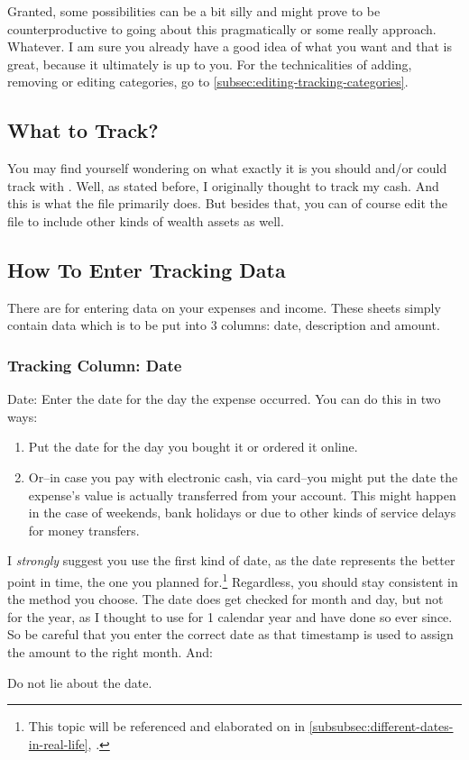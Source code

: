 Granted, some possibilities can be a bit silly and might prove to be counterproductive to going about this pragmatically or some really approach.
Whatever.
I am sure you already have a good idea of what you want and that is great, because it ultimately is up to you.
For the technicalities of adding, removing or editing categories, go to \autoref{subsec:editing-tracking-categories}.

\subsection{What to Track?}
\label{subsec:what-to-track}

You may find yourself wondering on what exactly it is you should and/or could track with \tfn.
Well, as stated before, I originally thought to track my cash.
And this is what the file primarily does.
But besides that, you can of course edit the file to include other kinds of wealth assets as well.

\subsection{How To Enter Tracking Data}
\label{subsec:enter-tracking-data}

There are  for entering data on your expenses and income.
These sheets simply contain data which is to be put into 3 columns: date, description and amount.

\subsubsection{Tracking Column: Date}
\label{subsec:tracking-column-date}

Date: Enter the date for the day the expense occurred.
You can do this in two ways:
\begin{enumerate}
	\item Put the date for the day you bought it or ordered it online.
	\item Or--in case you pay with electronic cash, \eg via card--you might put the date the expense's value is actually transferred from your account.
	This might happen in the case of weekends, bank holidays or due to other kinds of service delays for money transfers.
\end{enumerate}
I \emph{strongly} suggest you use the first kind of date, as the date represents the better point in time, \ie the one you planned for.\footnote{This topic will be referenced and elaborated on in \autoref{subsubsec:different-dates-in-real-life}, .}
Regardless, you should stay consistent in the method you choose.
The date does get checked for month and day, but not for the year, as I thought to use \tfn for 1 calendar year and have done so ever since.
So be careful that you enter the correct date as that timestamp is used to assign the amount to the right month.
And:
\begin{specialnote}
	Do not lie about the date.
\end{specialnote}

